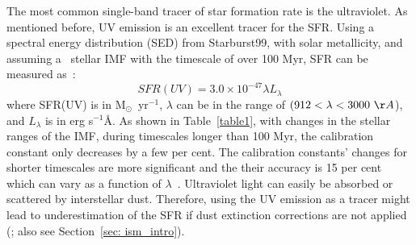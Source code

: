 The most common single-band tracer of star formation rate is the ultraviolet.
As mentioned before, UV emission is an excellent tracer for the SFR.
Using a spectral energy distribution (SED) from Starburst99, with solar metallicity, and assuming a~\cite{Kroupa01} stellar IMF with the timescale of over 100 Myr, SFR can be measured as~\citep{Leitherer99}:
\begin{equation}
SFR(UV) = 3.0 \times 10^{-47}\lambda L_{\lambda}
\end{equation}
where SFR(UV) is in M$_{\odot}$~yr$^{-1}$, $\lambda$ can be in the range of $(912< \lambda < 3000~\AA$), and $L_{\lambda}$ is in erg s$^{-1}$\AA.
As shown in Table~\ref{table1}, with changes in the stellar ranges of the IMF, during timescales longer than 100 Myr, the calibration constant only decreases by a few per cent.
The calibration constants' changes for shorter timescales are more significant and 
the their accuracy is 15 per cent which can vary as a function of $\lambda$~\citep{Calzetti13}.
Ultraviolet light can easily be absorbed or scattered by interstellar dust. 
Therefore, using the UV emission as a tracer might lead to underestimation of the SFR if dust extinction corrections are not applied (\cite{Kennicutt12}; also see Section~\ref{sec: ism_intro}). 


